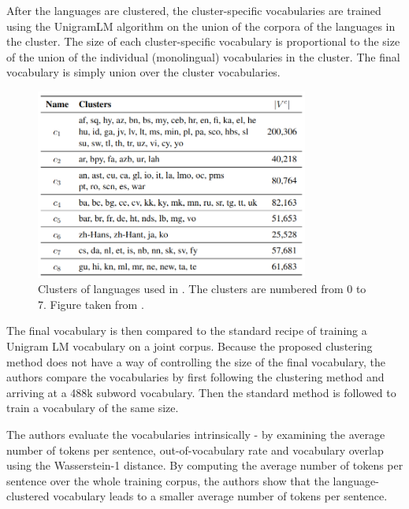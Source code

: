 After the languages are clustered, the cluster-specific vocabularies are trained using the UnigramLM algorithm on the union of the corpora of the languages in the cluster. The size of each cluster-specific vocabulary is proportional to the size of the union of the individual (monolingual) vocabularies in the cluster. The final vocabulary is simply union over the cluster vocabularies.


\begin{figure}[ht]
    \centering
    \includegraphics[width=0.8\textwidth]{img/temp/chung_clusters.png}
    \caption{Clusters of languages used in \cite{chung_improving_2020}. The clusters are numbered from 0 to 7. Figure taken from \cite{chung_improving_2020}.}
    \label{fig:chung_clusters}
\end{figure}


The final vocabulary is then compared to the standard recipe of training a Unigram LM vocabulary on a joint corpus. Because the proposed clustering method does not have a way of controlling the size of the final vocabulary, the authors compare the vocabularies by first following the clustering method and arriving at a 488k subword vocabulary. Then the standard method is followed to train a vocabulary of the same size.

The authors evaluate the vocabularies intrinsically - by examining the average number of tokens per sentence, out-of-vocabulary rate and vocabulary overlap using the Wasserstein-1 distance.
By computing the average number of tokens per sentence over the whole training corpus, the authors show that the language-clustered vocabulary leads to a smaller average number of tokens per sentence.


